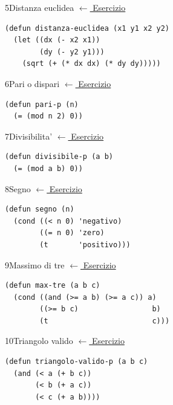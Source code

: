 \label{sol:5}
\begin{solbox}{5}{Distanza euclidea}
\small\color{black!55}\hyperref[ex:5]{$\leftarrow$ Esercizio}\normalsize\color{black}
\begin{lstlisting}
(defun distanza-euclidea (x1 y1 x2 y2)
  (let ((dx (- x2 x1))
        (dy (- y2 y1)))
    (sqrt (+ (* dx dx) (* dy dy)))))
\end{lstlisting}
\end{solbox}

\label{sol:6}
\begin{solbox}{6}{Pari o dispari}
\small\color{black!55}\hyperref[ex:6]{$\leftarrow$ Esercizio}\normalsize\color{black}
\begin{lstlisting}
(defun pari-p (n)
  (= (mod n 2) 0))
\end{lstlisting}
\end{solbox}

\label{sol:7}
\begin{solbox}{7}{Divisibilita'}
\small\color{black!55}\hyperref[ex:7]{$\leftarrow$ Esercizio}\normalsize\color{black}
\begin{lstlisting}
(defun divisibile-p (a b)
  (= (mod a b) 0))
\end{lstlisting}
\end{solbox}

\label{sol:8}
\begin{solbox}{8}{Segno}
\small\color{black!55}\hyperref[ex:8]{$\leftarrow$ Esercizio}\normalsize\color{black}
\begin{lstlisting}
(defun segno (n)
  (cond ((< n 0) 'negativo)
        ((= n 0) 'zero)
        (t       'positivo)))
\end{lstlisting}
\end{solbox}

\label{sol:9}
\begin{solbox}{9}{Massimo di tre}
\small\color{black!55}\hyperref[ex:9]{$\leftarrow$ Esercizio}\normalsize\color{black}
\begin{lstlisting}
(defun max-tre (a b c)
  (cond ((and (>= a b) (>= a c)) a)
        ((>= b c)                 b)
        (t                        c)))
\end{lstlisting}
\end{solbox}

\label{sol:10}
\begin{solbox}{10}{Triangolo valido}
\small\color{black!55}\hyperref[ex:10]{$\leftarrow$ Esercizio}\normalsize\color{black}
\begin{lstlisting}
(defun triangolo-valido-p (a b c)
  (and (< a (+ b c))
       (< b (+ a c))
       (< c (+ a b))))
\end{lstlisting}
\end{solbox}

